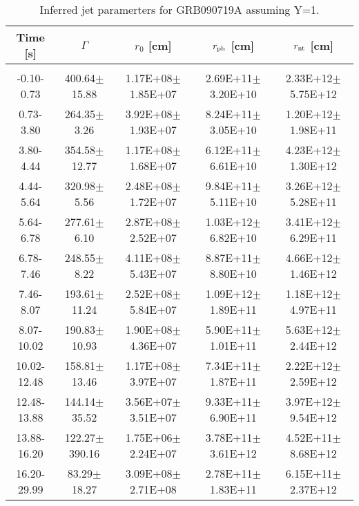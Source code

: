 \begin{table}[htp]
\scriptsize
\label{tab:}
\begin{tabular}{c c c c c}
Time [s] & $\Gamma$ & $r_0$ [cm] & $r_{\rm ph}$ [cm] & $r_{\rm nt}$ [cm] \\
\hline \hline\\ 

-0.10-0.73 & 400.64$\pm$15.88 & 1.17E+08$\pm$1.85E+07 & 2.69E+11$\pm$3.20E+10 & 2.33E+12$\pm$5.75E+12 \\ 

0.73-3.80 & 264.35$\pm$3.26 & 3.92E+08$\pm$1.93E+07 & 8.24E+11$\pm$3.05E+10 & 1.20E+12$\pm$1.98E+11 \\ 

3.80-4.44 & 354.58$\pm$12.77 & 1.17E+08$\pm$1.68E+07 & 6.12E+11$\pm$6.61E+10 & 4.23E+12$\pm$1.30E+12 \\ 

4.44-5.64 & 320.98$\pm$5.56 & 2.48E+08$\pm$1.72E+07 & 9.84E+11$\pm$5.11E+10 & 3.26E+12$\pm$5.28E+11 \\ 

5.64-6.78 & 277.61$\pm$6.10 & 2.87E+08$\pm$2.52E+07 & 1.03E+12$\pm$6.82E+10 & 3.41E+12$\pm$6.29E+11 \\ 

6.78-7.46 & 248.55$\pm$8.22 & 4.11E+08$\pm$5.43E+07 & 8.87E+11$\pm$8.80E+10 & 4.66E+12$\pm$1.46E+12 \\ 

7.46-8.07 & 193.61$\pm$11.24 & 2.52E+08$\pm$5.84E+07 & 1.09E+12$\pm$1.89E+11 & 1.18E+12$\pm$4.97E+11 \\ 

8.07-10.02 & 190.83$\pm$10.93 & 1.90E+08$\pm$4.36E+07 & 5.90E+11$\pm$1.01E+11 & 5.63E+12$\pm$2.44E+12 \\ 

10.02-12.48 & 158.81$\pm$13.46 & 1.17E+08$\pm$3.97E+07 & 7.34E+11$\pm$1.87E+11 & 2.22E+12$\pm$2.59E+12 \\ 

12.48-13.88 & 144.14$\pm$35.52 & 3.56E+07$\pm$3.51E+07 & 9.33E+11$\pm$6.90E+11 & 3.97E+12$\pm$9.54E+12 \\ 

13.88-16.20 & 122.27$\pm$390.16 & 1.75E+06$\pm$2.24E+07 & 3.78E+11$\pm$3.61E+12 & 4.52E+11$\pm$8.68E+12 \\ 

16.20-29.99 & 83.29$\pm$18.27 & 3.09E+08$\pm$2.71E+08 & 2.78E+11$\pm$1.83E+11 & 6.15E+11$\pm$2.37E+12 \\ 

\end{tabular}
\caption{Inferred jet paramerters for GRB090719A assuming Y=1.}
\end{table}
